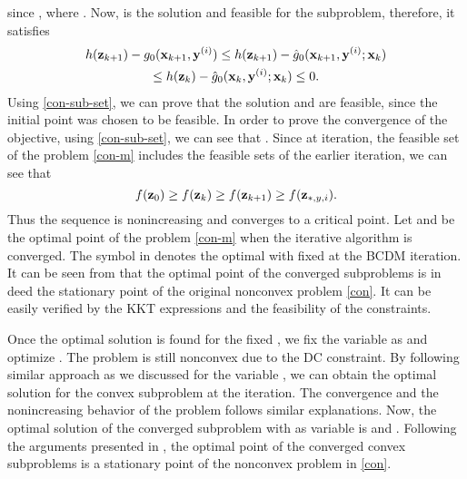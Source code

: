 since , where . Now,  is the solution and feasible for the  subproblem, therefore, it satisfies
\begin{multline}
h(\mz_{k+1}) - {g}_0(\mx_{k+1},\iterate{\myb}{i}) \leq h(\mz_{k+1}) - \hat{g}_0(\mx_{k+1},\iterate{\myb}{i};\mxb_k) \\
\leq h(\mz_{k}) - \hat{g}_0(\mx_{k},\iterate{\myb}{i};\mxb_k) \leq 0. \label{con-sub-set}
\end{multline}
Using \eqref{con-sub-set}, we can prove that the solution  and  are feasible, since the initial point  was chosen to be feasible. In order to prove the convergence of the objective, using \eqref{con-sub-set}, we can see that . Since at  iteration, the feasible set of the problem \eqref{con-m} includes the feasible sets of the earlier iteration, we can see that 
\begin{equation} \label{con-convergence}
f(\mz_0) \geq f(\mz_k) \geq f(\mz_{k+1}) \geq f(\mz_{\ast,y,i}). 
\end{equation}
Thus the sequence  is nonincreasing and converges to a critical point. Let \me{\mx_{\ast}} and  be the optimal point of the problem \eqref{con-m} when the iterative algorithm is converged. The symbol  in  denotes the optimal \me{\mz} with fixed \me{\my} at the  \ac{BCDM} iteration. It can be seen from \cite{marks1978technical} that the optimal point of the converged subproblems is in deed the stationary point of the original nonconvex problem \eqref{con}. It can be easily verified by the \ac{KKT} expressions and the feasibility of the constraints.

Once the optimal solution is found for the fixed \me{\my}, we fix the variable \me{\mx} as  and optimize \me{\my}. The problem is still nonconvex due to the \ac{DC} constraint. By following similar approach as we discussed for the variable \me{\mx}, we can obtain the optimal solution  for the convex subproblem at the  iteration. The convergence and the nonincreasing behavior of the problem follows similar explanations. Now, the optimal solution of the converged subproblem with \me{\my} as variable is \me{\my_{\ast}} and . Following the arguments presented in \cite{marks1978technical}, the optimal point of the converged convex subproblems is a stationary point of the nonconvex problem in \eqref{con}.

